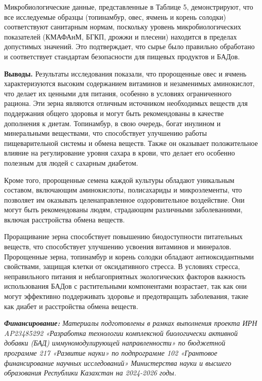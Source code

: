 \begin{multicols}{2}
Микробиологические данные, представленные в Таблице 5, демонстрируют,
что все исследуемые образцы (топинамбур, овес, ячмень и корень солодки)
соответствуют санитарным нормам, поскольку уровень микробиологических
показателей (КМАФАнМ, БГКП, дрожжи и плесени) находится в пределах
допустимых значений. Это подтверждает, что сырье было правильно
обработано и соответствует стандартам безопасности для пищевых продуктов
и БАДов.

{\bfseries Выводы.} Результаты исследования показали, что пророщенные овес
и ячмень характеризуются высоким содержанием витаминов и незаменимых
аминокислот, что делает их ценными для питания, особенно в условиях
ограниченного рациона. Эти зерна являются отличным источником
необходимых веществ для поддержания общего здоровья и могут быть
рекомендованы в качестве дополнения к диетам. Топинамбур, в свою
очередь, богат инулином и минеральными веществами, что способствует
улучшению работы пищеварительной системы и обмена веществ. Также он
оказывает положительное влияние на регулирование уровня сахара в крови,
что делает его особенно полезным для людей с сахарным диабетом.

Кроме того, пророщенные семена каждой культуры обладают уникальным
составом, включающим аминокислоты, полисахариды и микроэлементы, что
позволяет им оказывать целенаправленное оздоровительное воздействие. Они
могут быть рекомендованы людям, страдающим различными заболеваниями,
включая расстройства обмена веществ.

Проращивание зерна способствует повышению биодоступности питательных
веществ, что способствует улучшению усвоения витаминов и минералов.
Пророщенные зерна, топинамбур и корень солодки обладают антиоксидантными
свойствами, защищая клетки от оксидативного стресса. В условиях стресса,
неправильного питания и неблагоприятных экологических факторов важность
использования БАДов с растительными компонентами возрастает, так как они
могут эффективно поддерживать здоровье и предотвращать заболевания,
такие как диабет и расстройства обмена веществ.

\emph{{\bfseries Финансирование:} Материалы подготовлены в рамках
выполнения проекта ИРН AP23485292 «Разработка технологии комплексной
биологически активной добавки (БАД) иммуномодулирующей направленности»
по бюджетной программе 217 «Развитие науки» по подпрограмме 102
«Грантовое финансирование научных исследований» Министерства науки и
высшего образования Республики Казахстан на 2024-2026 годы.}
\end{multicols}

